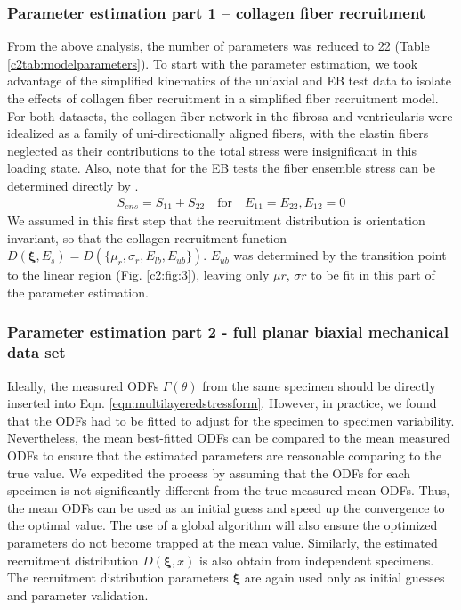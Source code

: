 \subsubsection{Parameter estimation part 1 – collagen fiber recruitment} \label{c2:sec:2254}

    From the above analysis, the number of parameters was reduced to 22 (Table \ref{c2tab:modelparameters}). To start with the parameter estimation, we took advantage of the simplified kinematics of the uniaxial and EB test data to isolate the effects of collagen fiber recruitment in a simplified fiber recruitment model. For both datasets, the collagen fiber network in the fibrosa and ventricularis were idealized as a family of uni-directionally aligned fibers, with the elastin fibers neglected as their contributions to the total stress were insignificant in this loading state. Also, note that for the EB tests the fiber ensemble stress can be determined directly by \cite{sacks_biaxial_2000}.
        \begin{equation}\label{c2eqn:ensembleform}
        \begin{aligned}
        S_{ens} = S_{11} + S_{22} \quad \text{for} \quad E_{11} = E_{22}, E_{12} = 0
        \end{aligned}
        \end{equation}
    We assumed in this first step that the recruitment distribution is orientation invariant, so that the collagen recruitment function $D(\mathbf{\xi},E_s) = D(\{\mu_r, \sigma_r, E_{lb}, E_{ub}\})$. $E_{ub}$ was determined by the transition point to the linear region (Fig. \ref{c2:fig:3}), leaving only $\mu r$, $\sigma r$ to be fit in this part of the parameter estimation. 
    
    
\subsubsection{Parameter estimation part 2 - full planar biaxial mechanical data set}

    Ideally, the measured ODFs $\Gamma(\theta)$ from the same specimen should be directly inserted into Eqn. \ref{eqn:multilayeredstressform}. However, in practice, we found that the ODFs had to be fitted to adjust for the specimen to specimen variability. Nevertheless, the mean best-fitted ODFs can be compared to the mean measured ODFs to ensure that the estimated parameters are reasonable comparing to the true value. We expedited the process by assuming that the ODFs for each specimen is not significantly different from the true measured mean ODFs. Thus, the mean ODFs can be used as an initial guess and speed up the convergence to the optimal value. The use of a global algorithm will also ensure the optimized parameters do not become trapped at the mean value. Similarly, the estimated recruitment distribution $D(\mathbf{\xi}, x)$ is also obtain from independent specimens. The recruitment distribution parameters $\mathbf{\xi}$ are again used only as initial guesses and parameter validation.
    

